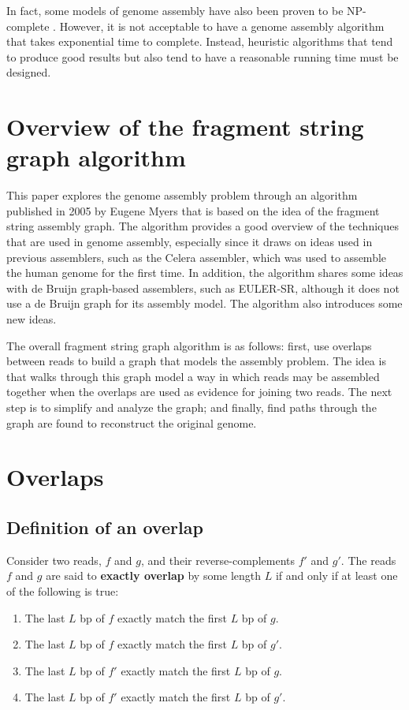 \documentclass[10pt]{article}
\newcommand{\LengthVar}{L}
\begin{document}
In fact, some models of genome assembly have also been proven to be NP-complete
\cite{Medvedev2007}.  However, it is not acceptable to have a genome assembly
algorithm that takes exponential time to complete.  Instead, heuristic
algorithms that tend to produce good results but also tend to have a reasonable
running time must be designed.

\section{Overview of the fragment string graph algorithm}

This paper explores the genome assembly problem through an algorithm published
in 2005 by Eugene Myers\cite{Myers2005} that is based on the idea of the
fragment string assembly graph.  The algorithm provides a good overview of the
techniques that are used in genome assembly, especially since it draws on ideas
used in previous assemblers, such as the Celera assembler, which was used to
assemble the human genome for the first time\cite{Venter2001}.  In addition, the
algorithm shares some ideas with de Bruijn graph-based assemblers, such as
EULER-SR\cite{Pevzner2001}, although it does not use a de Bruijn graph for its
assembly model.  The algorithm also introduces some new ideas.

The overall fragment string graph algorithm is as follows: first, use overlaps
between reads to build a graph that models the assembly problem.  The idea is
that walks through this graph model a way in which reads may be assembled
together when the overlaps are used as evidence for joining two reads.  The next
step is to simplify and analyze the graph; and finally, find paths through the
graph are found to reconstruct the original genome.

\section{Overlaps}

\subsection{Definition of an overlap}
	Consider two reads, $f$ and $g$, and their reverse-complements $f'$ and
	$g'$.  The reads $f$ and $g$ are said to {\bf exactly overlap} by some
	length $\LengthVar$ if and only if at least one of the following is
	true:
	\begin{enumerate}
		\item The last $\LengthVar$ bp of $f$ exactly match the first
		$\LengthVar$ bp of $g$.
		\item The last $\LengthVar$ bp of $f$ exactly match the first
		$\LengthVar$ bp of $g'$.
		\item The last $\LengthVar$ bp of $f'$ exactly match the first
		$\LengthVar$ bp of $g$.
		\item The last $\LengthVar$ bp of $f'$ exactly match the first
		$\LengthVar$ bp of $g'$.
	\end{enumerate}
\end{document}
